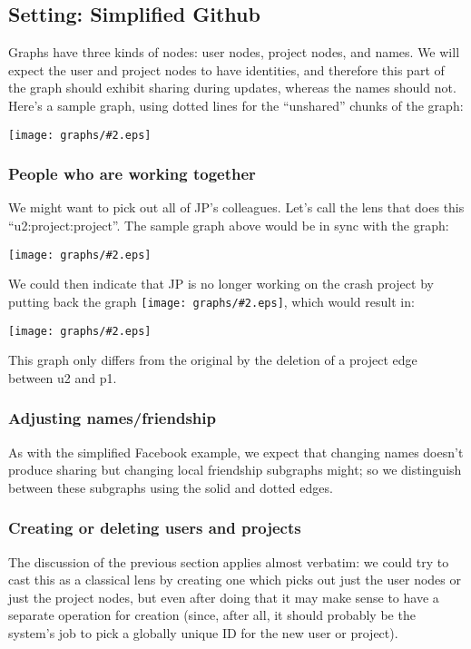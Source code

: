 \documentclass{article}
\newcommand{\scaledgraph}[2]{\texttt{[image: graphs/\#2.eps]}}
\newcommand{\graph}[1]{\scaledgraph{0.5}{#1}}
\newcommand{\centeredgraph}[1]{\begin{center}\graph{#1}\end{center}}
\newcommand{\inlinegraph}[1]{\scaledgraph{0.2}{#1}}
\begin{document}
\subsection*{Setting: Simplified Github}

Graphs have three kinds of nodes: user nodes, project nodes, and names. We
will expect the user and project nodes to have identities, and therefore
this part of the graph should exhibit sharing during updates, whereas the
names should not. Here's a sample graph, using dotted lines for the
``unshared'' chunks of the graph:

\centeredgraph{github-start}

\subsubsection*{People who are working together}

We might want to pick out all of JP's colleagues. Let's call the lens that
does this ``u2:project:project''. The sample graph above would be in sync
with the graph:
\centeredgraph{github-colleagues}
We could then indicate that JP is no longer working on the crash project by
putting back the graph \inlinegraph{github-fewer-projects}, which would
result in:
\centeredgraph{github-start-fewer-projects}
This graph only differs from the original by the deletion of a project edge
between u2 and p1.

\subsubsection*{Adjusting names/friendship}

As with the simplified Facebook example, we expect that changing names
doesn't produce sharing but changing local friendship subgraphs might; so we
distinguish between these subgraphs using the solid and dotted edges.

\subsubsection*{Creating or deleting users and projects}

The discussion of the previous section applies almost verbatim: we could try
to cast this as a classical lens by creating one which picks out just the
user nodes or just the project nodes, but even after doing that it may make
sense to have a separate operation for creation (since, after all, it should
probably be the system's job to pick a globally unique ID for the new user
or project).
\end{document}
